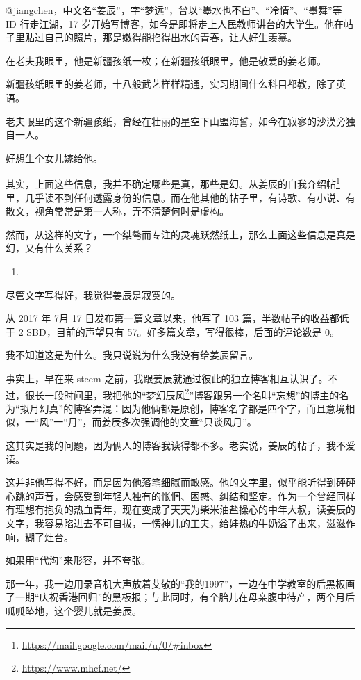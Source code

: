 \documentclass[]{ctexbook}
\renewcommand{\href}[2]{#2\footnote{\url{#1}}}
\begin{document}
@jiangchen，中文名``姜辰''，字``梦远''，曾以``墨水也不白''、``冷情''、``墨舞''等 ID 行走江湖，17 岁开始写博客，如今是即将走上人民教师讲台的大学生。他在帖子里贴过自己的照片，那是嫩得能掐得出水的青春，让人好生羡慕。

在老夫我眼里，他是新疆孩纸一枚；在新疆孩纸眼里，他是敬爱的姜老师。

新疆孩纸眼里的姜老师，十八般武艺样样精通，实习期间什么科目都教，除了英语。

老夫眼里的这个新疆孩纸，曾经在壮丽的星空下山盟海誓，如今在寂寥的沙漠旁独自一人。

好想生个女儿嫁给他。

其实，上面这些信息，我并不确定哪些是真，那些是幻。从姜辰的\href{https://mail.google.com/mail/u/0/\#inbox}{自我介绍帖}里，几乎读不到任何透露身份的信息。而在他其他的帖子里，有诗歌、有小说、有散文，视角常常是第一人称，弄不清楚何时是虚构。

然而，从这样的文字，一个桀骜而专注的灵魂跃然纸上，那么上面这些信息是真是幻，又有什么关系？

\begin{enumerate}
\def\labelenumi{(\arabic{enumi})}
\setcounter{enumi}{2}
\item
\end{enumerate}

尽管文字写得好，我觉得姜辰是寂寞的。

从 2017 年 7月 17 日发布第一篇文章以来，他写了 103 篇，半数帖子的收益都低于 2 SBD，目前的声望只有 57。好多篇文章，写得很棒，后面的评论数是 0。

我不知道这是为什么。我只说说为什么我没有给姜辰留言。

事实上，早在来 steem 之前，我跟姜辰就通过彼此的独立博客相互认识了。不过，很长一段时间里，我把他的``\href{https://www.mhcf.net/}{梦幻辰风}''博客跟另一个名叫``忘想''的博主的名为``拟月幻真''的博客弄混：因为他俩都是原创，博客名字都是四个字，而且意境相似，一``风''一``月''，而姜辰多次强调他的文章``只谈风月''。

这其实是我的问题，因为俩人的博客我读得都不多。老实说，姜辰的帖子，我不爱读。

这并非他写得不好，而是因为他落笔细腻而敏感。他的文字里，似乎能听得到砰砰心跳的声音，会感受到年轻人独有的怅惘、困惑、纠结和坚定。作为一个曾经同样有理想有抱负的热血青年，现在变成了天天为柴米油盐操心的中年大叔，读姜辰的文字，我容易陷进去不可自拔，一愣神儿的工夫，给娃热的牛奶溢了出来，滋滋作响，糊了灶台。

如果用``代沟''来形容，并不夸张。

那一年，我一边用录音机大声放着艾敬的``我的1997''，一边在中学教室的后黑板画了一期``庆祝香港回归''的黑板报；与此同时，有个胎儿在母亲腹中待产，两个月后呱呱坠地，这个婴儿就是姜辰。
\end{document}
